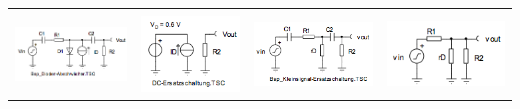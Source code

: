 \begin{tabular}{|p{4.3cm}|p{3.93cm}|p{4.5cm}|p{4.5cm}|}
			& 
			\\
			\parbox[c][3cm]{4.25cm}{\includegraphics[width=4.25cm]{./bilder/dc-kleinsignal-ersatz-beispiel.png}}
			& \parbox[c][3cm]{3.8cm}{\includegraphics[width=3.8cm]{./bilder/dc-kleinsignal-ersatz-dc.png}}
			& \parbox[c][3cm]{4.5cm}{\includegraphics[width=4.5cm]{./bilder/dc-kleinsignal-ersatz-LC.png}}
			& \parbox[c][3cm]{4.5cm}{\includegraphics[width=4.5cm]{./bilder/dc-kleinsignal-ersatz-ohneLC.png}}
			\\ \hline
			\end{tabular}
			


